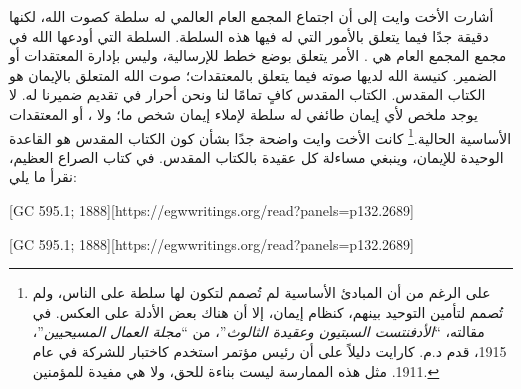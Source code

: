 أشارت الأخت وايت إلى أن اجتماع المجمع العام العالمي له سلطة كصوت الله، لكنها دقيقة جدًا فيما يتعلق بالأمور التي له فيها هذه السلطة. السلطة التي أودعها الله في مجمع المجمع العام هي . الأمر يتعلق بوضع خطط للإرسالية، وليس بإدارة المعتقدات أو الضمير. كنيسة الله لديها صوته فيما يتعلق بالمعتقدات؛ صوت الله المتعلق بالإيمان هو الكتاب المقدس. الكتاب المقدس كافٍ تمامًا لنا ونحن أحرار في تقديم ضميرنا له. لا يوجد ملخص لأي إيمان طائفي له سلطة لإملاء إيمان شخص ما؛ ولا ، أو المعتقدات الأساسية الحالية.\footnote{على الرغم من أن المبادئ الأساسية لم تُصمم لتكون لها سلطة على الناس، ولم تُصمم لتأمين التوحيد بينهم، كنظام إيمان، إلا أن هناك بعض الأدلة على العكس. في مقالته، “\textit{الأدفنتست السبتيون وعقيدة الثالوث}”، من “\textit{مجلة العمال المسيحيين}”، 1915، قدم د.م. كارايت دليلاً على أن رئيس مؤتمر استخدم  كاختبار للشركة في عام 1911. مثل هذه الممارسة ليست بناءة للحق، ولا هي مفيدة للمؤمنين.} كانت الأخت وايت واضحة جدًا بشأن كون الكتاب المقدس هو القاعدة الوحيدة للإيمان، وينبغي مساءلة كل عقيدة بالكتاب المقدس. في كتاب الصراع العظيم، نقرأ ما يلي:


[GC 595.1; 1888][https://egwwritings.org/read?panels=p132.2689]


[GC 595.1; 1888][https://egwwritings.org/read?panels=p132.2689]


